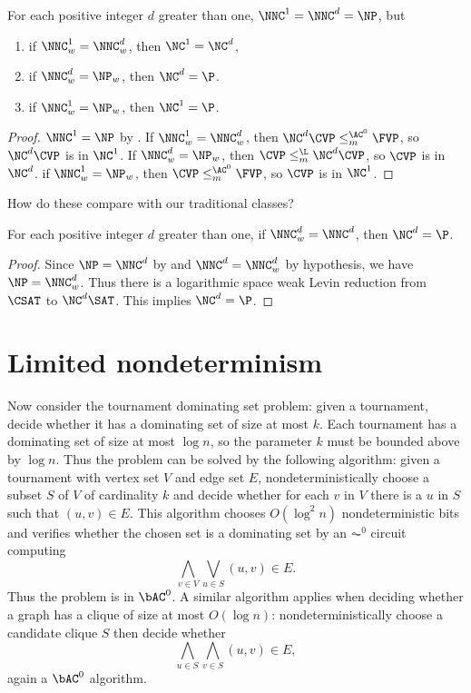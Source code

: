 \documentclass{article}
\begin{document}
\begin{theorem}
  For each positive integer $d$ greater than one, $\NNC^1 = \NNC^d = \NP$, but
  \begin{enumerate}
  \item if $\NNC^1_w = \NNC^d_w$, then $\NC^1 = \NC^d$,
  \item if $\NNC^d_w = \NP_w$, then $\NC^d = \P$.
  \item if $\NNC^1_w = \NP_w$, then $\NC^1 = \P$.
  \end{enumerate}
\end{theorem}
\begin{proof}
  $\NNC^1 = \NP$ by \autocite[Theorem~2.2]{wolf94}.
  If $\NNC^1_w = \NNC^d_w$, then $\NC^d \CVP \leq_m^{\AC^0} \FVP$, so $\NC^d \CVP$ is in $\NC^1$.
  If $\NNC^d_w = \NP_w$, then $\CVP \leq_m^{\L} \NC^d \CVP$, so $\CVP$ is in $\NC^d$.
  if $\NNC^1_w = \NP_w$, then $\CVP \leq_m^{\AC^0} \FVP$, so $\CVP$ is in $\NC^1$.
\end{proof}

How do these compare with our traditional classes?

\begin{theorem}
  For each positive integer $d$ greater than one, if $\NNC^d_w = \NNC^d$, then $\NC^d = \P$.
\end{theorem}
\begin{proof}
  Since $\NP = \NNC^d$ by \autocite[Theorem~2.2]{wolf94} and $\NNC^d = \NNC^d_w$ by hypothesis, we have $\NP = \NNC^d_w$.
  Thus there is a logarithmic space weak Levin reduction from $\CSAT$ to $\NC^d \SAT$.
  This implies $\NC^d = \P$.
\end{proof}

\section{Limited nondeterminism}

Now consider the tournament dominating set problem: given a tournament, decide whether it has a dominating set of size at most $k$.
Each tournament has a dominating set of size at most $\log n$, so the parameter $k$ must be bounded above by $\log n$.
Thus the problem can be solved by the following algorithm: given a tournament with vertex set $V$ and edge set $E$, nondeterministically choose a subset $S$ of $V$ of cardinality $k$ and decide whether for each $v$ in $V$ there is a $u$ in $S$ such that $(u, v) \in E$.
This algorithm chooses $O(\log^2 n)$ nondeterministic bits and verifies whether the chosen set is a dominating set by an $\AC^0$ circuit computing
$$
\bigwedge_{v \in V} \bigvee_{u \in S} (u, v) \in E.
$$
Thus the problem is in $\bAC^0$.
A similar algorithm applies when deciding whether a graph has a clique of size at most $O(\log n)$: nondeterministically choose a candidate clique $S$ then decide whether
$$
\bigwedge_{u \in S} \bigwedge_{v \in S} (u, v) \in E,
$$
again a $\bAC^0$ algorithm.
\end{document}
